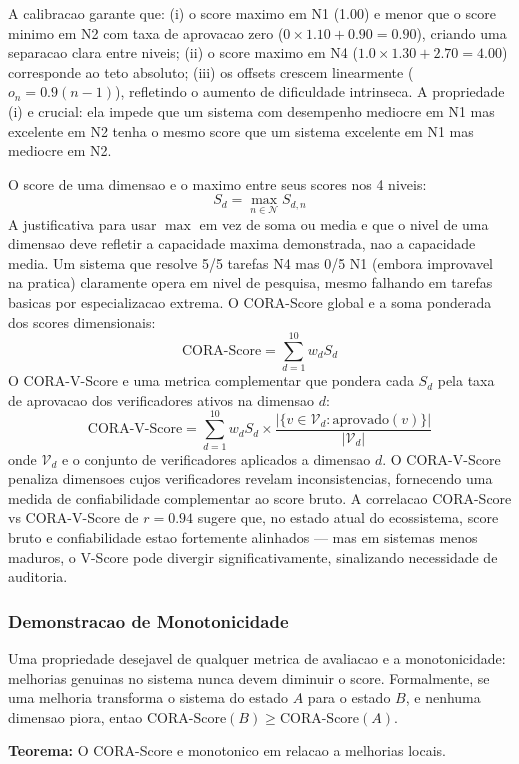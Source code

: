 A calibracao garante que: (i) o score maximo em N1 (1.00) e menor que o
score minimo em N2 com taxa de aprovacao zero ($0 \times 1.10 + 0.90 =
0.90$), criando uma separacao clara entre niveis; (ii) o score maximo em
N4 ($1.0 \times 1.30 + 2.70 = 4.00$) corresponde ao teto absoluto; (iii)
os offsets crescem linearmente ($o_n = 0.9(n-1)$), refletindo o aumento
de dificuldade intrinseca. A propriedade (i) e crucial: ela impede que um
sistema com desempenho mediocre em N1 mas excelente em N2 tenha o mesmo
score que um sistema excelente em N1 mas mediocre em N2.

O score de uma dimensao e o maximo entre seus scores nos 4 niveis:
\[
S_d = \max_{n \in \mathcal{N}} S_{d,n}
\]
A justificativa para usar $\max$ em vez de soma ou media e que o nivel de
uma dimensao deve refletir a capacidade maxima demonstrada, nao a
capacidade media. Um sistema que resolve 5/5 tarefas N4 mas 0/5 N1
(embora improvavel na pratica) claramente opera em nivel de pesquisa,
mesmo falhando em tarefas basicas por especializacao extrema. O CORA-Score
global e a soma ponderada dos scores dimensionais:
\[
\text{CORA-Score} = \sum_{d=1}^{10} w_d S_d
\]
O CORA-V-Score e uma metrica complementar que pondera cada $S_d$ pela
taxa de aprovacao dos verificadores ativos na dimensao $d$:
\[
\text{CORA-V-Score} = \sum_{d=1}^{10} w_d S_d \times
\frac{|\{v \in \mathcal{V}_d : \text{aprovado}(v)\}|}{|\mathcal{V}_d|}
\]
onde $\mathcal{V}_d$ e o conjunto de verificadores aplicados a dimensao
$d$. O CORA-V-Score penaliza dimensoes cujos verificadores revelam
inconsistencias, fornecendo uma medida de confiabilidade complementar ao
score bruto. A correlacao CORA-Score vs CORA-V-Score de $r = 0.94$ sugere
que, no estado atual do ecossistema, score bruto e confiabilidade estao
fortemente alinhados --- mas em sistemas menos maduros, o V-Score pode
divergir significativamente, sinalizando necessidade de auditoria.

\subsubsection{Demonstracao de Monotonicidade}

Uma propriedade desejavel de qualquer metrica de avaliacao e a
monotonicidade: melhorias genuinas no sistema nunca devem diminuir o
score. Formalmente, se uma melhoria transforma o sistema do estado $A$
para o estado $B$, e nenhuma dimensao piora, entao
$\text{CORA-Score}(B) \geq \text{CORA-Score}(A)$.

\textbf{Teorema:} O CORA-Score e monotonico em relacao a melhorias locais.

